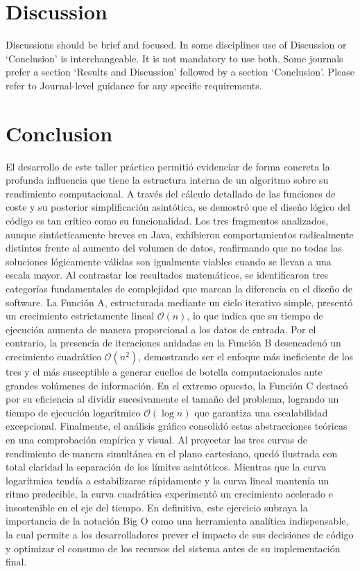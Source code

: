\documentclass[pdflatex,sn-mathphys-num]{sn-jnl}%
\theoremstyle{thmstyleone}%
\theoremstyle{thmstyletwo}%
\theoremstyle{thmstylethree}%
\begin{document}
\section{Discussion}\label{sec12}

Discussions should be brief and focused. In some disciplines use of Discussion or `Conclusion' is interchangeable. It is not mandatory to use both. Some journals prefer a section `Results and Discussion' followed by a section `Conclusion'. Please refer to Journal-level guidance for any specific requirements. 

\section{Conclusion}\label{sec13}

El desarrollo de este taller práctico permitió evidenciar de forma concreta la profunda influencia que tiene la estructura interna de un algoritmo sobre su rendimiento computacional. A través del cálculo detallado de las funciones de coste y su posterior simplificación asintótica, se demostró que el diseño lógico del código es tan crítico como su funcionalidad. Los tres fragmentos analizados, aunque sintácticamente breves en Java, exhibieron comportamientos radicalmente distintos frente al aumento del volumen de datos, reafirmando que no todas las soluciones lógicamente válidas 
son igualmente viables cuando se llevan a una escala mayor.
Al contrastar los resultados matemáticos, se identificaron tres categorías fundamentales de complejidad que marcan la diferencia en el diseño de software. La Función A, estructurada mediante un ciclo iterativo simple, presentó un crecimiento estrictamente lineal $\mathcal{O}(n)$, lo que indica que su tiempo de ejecución aumenta de manera proporcional a los datos de entrada. Por el contrario, la presencia de iteraciones anidadas en la Función B desencadenó un crecimiento cuadrático $\mathcal{O}(n^2)$, demostrando ser el enfoque más ineficiente de los tres y el más susceptible a 
generar cuellos de botella computacionales ante grandes volúmenes de información. En el extremo opuesto, la Función C destacó por su eficiencia al dividir sucesivamente el tamaño del problema, logrando un tiempo de ejecución logarítmico $\mathcal{O}(\log n)$ que garantiza una escalabilidad excepcional.
Finalmente, el análisis gráfico consolidó estas abstracciones teóricas en una comprobación empírica y visual. Al proyectar las tres curvas de rendimiento de manera simultánea en el plano cartesiano, quedó ilustrada con total claridad la separación de los límites asintóticos. Mientras que la curva logarítmica tendía a estabilizarse rápidamente y la curva lineal mantenía un ritmo predecible, la curva cuadrática experimentó un crecimiento acelerado e insostenible en el eje del tiempo. En definitiva, este ejercicio subraya la importancia de la notación Big O como una herramienta analítica indispensable, la cual permite a los desarrolladores prever el impacto de sus decisiones de código y optimizar el consumo de los recursos del sistema antes de su implementación final.
\end{document}
